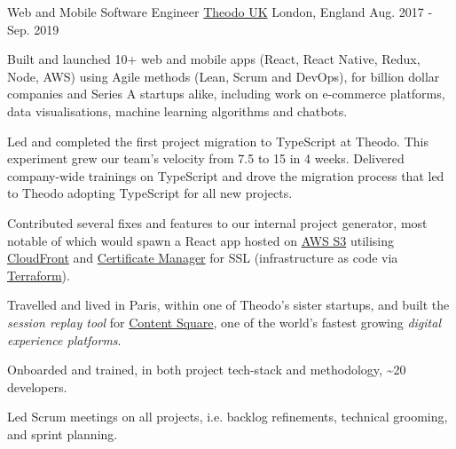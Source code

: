 \begin{cventries}
  \cventry
    {Web and Mobile Software Engineer}
    {\href{https://www.theodo.co.uk/}{Theodo UK}}
    {London, England}
    {Aug. 2017 - Sep. 2019}
    {
      \begin{cvitems}
        \item Built and launched 10+ web and mobile apps (React, React Native, Redux, Node, AWS) using Agile methods (Lean, Scrum and DevOps), for billion dollar companies and Series A startups alike, including work on e-commerce platforms, data visualisations, machine learning algorithms and chatbots.
        \item Led and completed the first project migration to TypeScript at Theodo. This experiment grew our team's velocity from 7.5 to 15 in 4 weeks. Delivered company-wide trainings on TypeScript and drove the migration process that led to Theodo adopting TypeScript for all new projects.
        \item Contributed several fixes and features to our internal project generator, most notable of which would spawn a React app hosted on \href{https://aws.amazon.com/s3/}{AWS S3} utilising \href{https://aws.amazon.com/cloudfront/}{CloudFront} and \href{https://aws.amazon.com/certificate-manager/}{Certificate Manager} for SSL (infrastructure as code via \href{https://www.terraform.io/}{Terraform}).
        \item Travelled and lived in Paris, within one of Theodo's sister startups, and built the \textit{session replay tool} for \href{https://contentsquare.com/}{Content Square}, one of the world's fastest growing \textit{digital experience platforms}.
        \item Onboarded and trained, in both project tech-stack and methodology, \textasciitilde{}20 developers.
        \item Led Scrum meetings on all projects, i.e. backlog refinements, technical grooming, and sprint planning. 
      \end{cvitems}
    }

\end{cventries}
